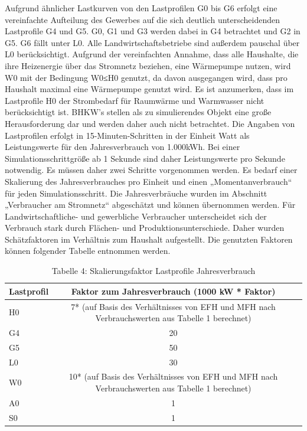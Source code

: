 Aufgrund ähnlicher Lastkurven von den Lastprofilen G0 bis G6 erfolgt eine vereinfachte Aufteilung des Gewerbes auf die sich deutlich unterscheidenden Lastprofile G4 und G5.
G0, G1 und G3 werden dabei in G4 betrachtet und G2 in G5. 
G6 fällt unter L0. 
Alle Landwirtschaftsbetriebe sind außerdem pauschal über L0 berücksichtigt. 
Aufgrund der vereinfachten Annahme, dass alle Haushalte, die ihre Heizenergie über das Stromnetz beziehen, eine Wärmepumpe nutzen, wird W0 mit der Bedingung W0≤H0 genutzt, da davon ausgegangen wird, dass pro Haushalt maximal eine Wärmepumpe genutzt wird. 
Es ist anzumerken, dass im Lastprofile H0 der Strombedarf für Raumwärme und Warmwasser nicht berücksichtigt ist. 
BHKW’s stellen als zu simulierendes Objekt eine große Herausforderung dar und werden daher auch nicht betrachtet.
Die Angaben von Lastprofilen erfolgt in 15-Minuten-Schritten in der Einheit Watt als Leistungswerte für den Jahresverbrauch von 1.000kWh. 
Bei einer Simulationsschrittgröße ab 1 Sekunde sind daher Leistungswerte pro Sekunde notwendig. 
Es müssen daher zwei Schritte vorgenommen werden. 
Es bedarf einer Skalierung des Jahresverbrauches pro Einheit und einen „Momentanverbrauch“ für jeden Simulationsschritt.
Die Jahresverbräuche wurden im Abschnitt „Verbraucher am Stromnetz“ abgeschätzt und können übernommen werden. 
Für Landwirtschaftliche- und gewerbliche Verbraucher unterscheidet sich der Verbrauch stark durch Flächen- und Produktionsunterschiede. 
Daher wurden Schätzfaktoren im Verhältnis zum Haushalt aufgestellt. Die genutzten Faktoren können folgender Tabelle entnommen werden.

\begin{table}[htbp]
    \centering
    \caption{Tabelle 4: Skalierungsfaktor Lastprofile Jahresverbrauch}
    \label{tab:skalierungsfaktor}
    \begin{tabular}{lcl}
        \toprule
        \textbf{Lastprofil} & \textbf{Faktor zum Jahresverbrauch (1000 kW * Faktor)} \\
        \midrule
        H0 & 7* (auf Basis des Verhältnisses von EFH und MFH nach Verbrauchswerten aus Tabelle 1 berechnet) \\
        G4 & 20 \\
        G5 & 50 \\
        L0 & 30 \\
        W0 & 10* (auf Basis des Verhältnisses von EFH und MFH nach Verbrauchswerten aus Tabelle 1 berechnet) \\
        A0 & 1 \\
        S0 & 1 \\
        \bottomrule
    \end{tabular}
\end{table}
    
